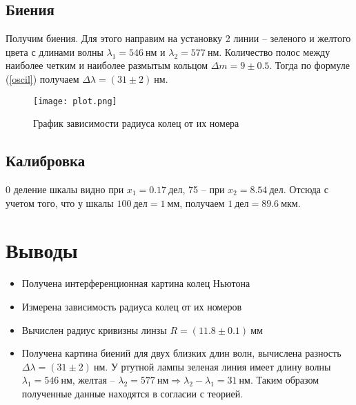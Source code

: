 \documentclass[10pt,a4paper]{article}
\begin{document}
\subsection*{Биения}
Получим биения. Для этого направим на установку 2 линии -- зеленого и желтого цвета с длинами волны $\lambda_1 = 546\ \text{нм}$ и $\lambda_2 = 577\ \text{нм}$. Количество полос между наиболее четким и наиболее размытым кольцом $\Delta m = 9\pm0.5$. Тогда по формуле (\ref{oscil}) получаем $\Delta\lambda = (31\pm2)\ \text{нм}$.

\begin{multicols}{2}


\end{multicols}

\begin{figure}[H]
\centering
\texttt{[image: plot.png]}
\caption{График зависимости радиуса колец от их номера}
\end{figure}
\subsection*{Калибровка}
0 деление шкалы видно при $x_1 = 0.17\ \text{дел}$, 75 -- при $x_2 = 8.54\ \text{дел}$. Отсюда с учетом того, что у шкалы $100\ \text{дел} = 1\ \text{мм}$, получаем $1\ \text{дел} = 89.6\ \text{мкм}$.


\section*{Выводы}
\begin{itemize}
\item Получена интерференционная картина колец Ньютона
\item Измерена зависимость радиуса колец от их номеров
\item Вычислен радиус кривизны линзы $R = (11.8\pm0.1)\ \text{мм}$
\item Получена картина биений для двух близких длин волн, вычислена разность $\Delta\lambda = (31\pm2)\ \text{нм}$. У ртутной лампы зеленая линия имеет длину волны $\lambda_1 = 546\ \text{нм}$, желтая -- $\lambda_2 = 577\ \text{нм} \Rightarrow \lambda_2-\lambda_1 = 31\ \text{нм}$. Таким образом полученные данные находятся в согласии с теорией.
\end{itemize}
\end{document}
